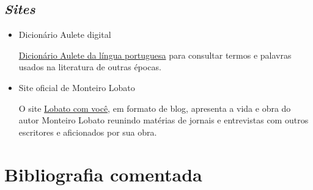 \documentclass[11pt]{extarticle}
\begin{document}
\subsection{\emph{Sites}}

\begin{itemize}

\item Dicionário Aulete digital

\href{http://www.aulete.com.br/}{Dicionário Aulete da língua portuguesa} para 
consultar termos e palavras usados na literatura de outras épocas.

\item  Site oficial de Monteiro Lobato

O site \href{https://lobato.com.vc//}{Lobato com você}, em formato de 
blog, apresenta a vida e obra do autor Monteiro Lobato 
reunindo matérias de jornais e entrevistas com outros escritores e aficionados 
por sua obra. 

\end{itemize}

\section{Bibliografia comentada}
\end{document}
